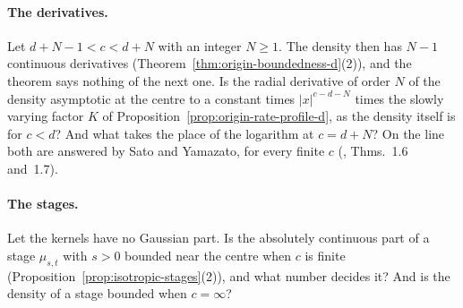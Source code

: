 \paragraph{The derivatives.} Let $d + N - 1 < c < d + N$ with an integer $N \ge 1$. The density
then has $N - 1$ continuous derivatives (Theorem~\ref{thm:origin-boundedness-d}(2)), and the
theorem says nothing of the next one. Is the radial derivative of order $N$ of the density
asymptotic at the centre to a constant times $|x|^{c-d-N}$ times the slowly varying factor $K$
of Proposition~\ref{prop:origin-rate-profile-d}, as the density itself is for $c < d$? And what
takes the place of the logarithm at $c = d + N$? On the line both are answered by Sato and
Yamazato, for every finite $c$ (, Thms.~1.6 and~1.7).

\paragraph{The stages.} Let the kernels have no Gaussian part. Is the absolutely continuous
part of a stage $\mu_{s,t}$ with $s > 0$ bounded near the centre when $c$ is finite
(Proposition~\ref{prop:isotropic-stages}(2)), and what number decides it? And is the density of
a stage bounded when $c = \infty$?
